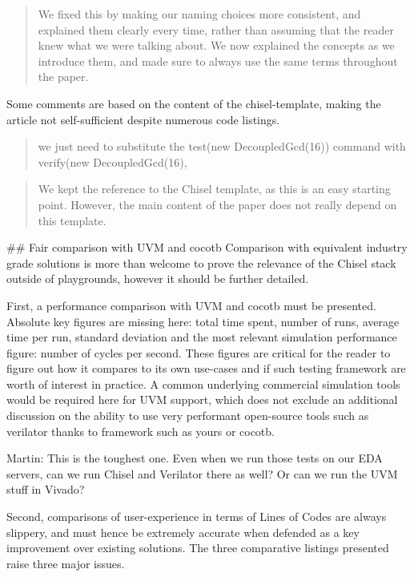 \documentclass{article}
\newcommand{\martin}[1]{{\color{blue} Martin: #1\\}}
\newcommand{\reply}[1]{{\color{blue} #1}}
\begin{document}
\begin{quote}
\reply{
We fixed this by making our naming choices more consistent, and explained them clearly every time, rather than assuming that the reader knew what we were talking about.
We now explained the concepts as we introduce them, and made sure to always use the same terms throughout the paper.
}
\end{quote}


Some comments are based on the content of the chisel-template, making the article not self-sufficient despite numerous code listings.
\begin{quote}
we just need to substitute the test(new DecoupledGcd(16)) command with verify(new DecoupledGcd(16),
\end{quote}

\begin{quote}
\reply{
We kept the reference to the Chisel template, as this is an easy starting point.
However, the main content of the paper does not really depend on this template.
}
\end{quote}


\#\# Fair comparison with UVM and cocotb
Comparison with equivalent industry grade solutions is more than welcome to prove the relevance of the Chisel stack outside of playgrounds, however it should be further detailed.

First, a performance comparison with UVM and cocotb must be presented.
Absolute key figures are missing here: total time spent, number of runs, average time per run, standard deviation and the most relevant simulation performance figure: number of cycles per second.
These figures are critical for the reader to figure out how it compares to its own use-cases and if such testing framework are worth of interest in practice.
A common underlying commercial simulation tools would be required here for UVM support, which does not exclude an additional discussion on the ability to use very performant open-source tools such as verilator thanks to framework such as yours or cocotb.

\martin{This is the toughest one. Even when we run those tests on our EDA servers, can we run
Chisel and Verilator there as well? Or can we run the UVM stuff in Vivado?}

Second, comparisons of user-experience in terms of Lines of Codes are always slippery, and must hence be extremely accurate when defended as a key improvement over existing solutions.
The three comparative listings presented raise three major issues.
\end{document}

